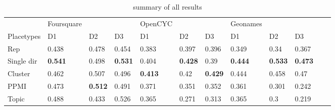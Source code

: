 \begin{landscape}
\begin{table}[]
\begin{tabular}{llll@{\hskip 0.25in}lll@{\hskip 0.25in}lllll}
			& Foursquare                      &                                 &                                 & OpenCYC                         &                                 &                                 & Geonames                        &                                 &                                 &             &             \\
			Placetypes        & D1                              & D2                              & D3                              & D1                              & D2                              & D3                              & D1                              & D2                              & D3                              &             &             \\
			\toprule[\heavyrulewidth]
			Rep               & 0.438                           & 0.478                           & 0.454                           & 0.383                           & 0.397                           & 0.396                           & 0.349                           & 0.34                            & 0.367                           &             &             \\
			Single dir        & \textbf{0.541} & 0.498                           & \textbf{0.531} & 0.404                           & \textbf{0.428} & 0.39                            & \textbf{0.444} & \textbf{0.533} & \textbf{0.473} &             &             \\
			Cluster           & 0.462                           & 0.507                           & 0.496                           & \textbf{0.413} & 0.42                            & \textbf{0.429} & 0.444                           & 0.458                           & 0.47                            &             &             \\
			PPMI              & 0.473                           & \textbf{0.512} & 0.491                           & 0.371                           & 0.351                           & 0.352                           & 0.361                           & 0.301                           & 0.242                           &             &             \\
			Topic             & 0.488                           & 0.433                           & 0.526                           & 0.365                           & 0.271                           & 0.313                           & 0.365                           & 0.3                             & 0.219                           &             &             \\   
		\end{tabular}
		\caption{summary of all results}
	\end{table}
\end{landscape}

